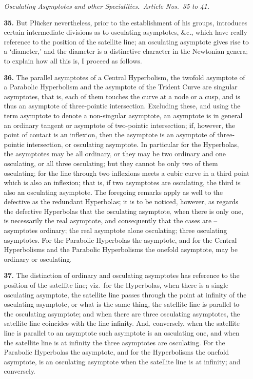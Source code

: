 \documentclass[11pt,a4paper]{article}
\begin{document}
\medskip

\noindent\textit{Osculating Asymptotes and other Specialities.\ Article Nos.\ 35 to 41.}

\medskip

\textbf{35.} But Pl\"ucker nevertheless, prior to the establishment of his groups, introduces certain intermediate divisions as to osculating asymptotes, \&c., which have really reference to the position of the satellite line; an osculating asymptote gives rise to a `diameter,' and the diameter is a distinctive character in the Newtonian genera; to explain how all this is, I proceed as follows.

\medskip

\textbf{36.} The parallel asymptotes of a Central Hyperbolism, the twofold asymptote of a Parabolic Hyperbolism and the asymptote of the Trident Curve are singular asymptotes, that is, each of them touches the curve at a node or a cusp, and is thus an asymptote of three-pointic intersection. Excluding these, and using the term asymptote to denote a non-singular asymptote, an asymptote is in general an ordinary tangent or asymptote of two-pointic intersection; if, however, the point of contact is an inflexion, then the asymptote is an asymptote of three-pointic intersection, or osculating asymptote. In particular for the Hyperbolas, the asymptotes may be all ordinary, or they may be two ordinary and one osculating, or all three osculating; but they cannot be only two of them osculating; for the line through two inflexions meets a cubic curve in a third point which is also an inflexion; that is, if two asymptotes are osculating, the third is also an osculating asymptote. The foregoing remarks apply as well to the defective as the redundant Hyperbolas; it is to be noticed, however, as regards the defective Hyperbolas that the osculating asymptote, when there is only one, is necessarily the real asymptote, and consequently that the cases are -- asymptotes ordinary; the real asymptote alone osculating; three osculating asymptotes. For the Parabolic Hyperbolas the asymptote, and for the Central Hyperbolisms and the Parabolic Hyperbolisms the onefold asymptote, may be ordinary or osculating.

\medskip

\textbf{37.} The distinction of ordinary and osculating asymptotes has reference to the position of the satellite line; viz.\ for the Hyperbolas, when there is a single osculating asymptote, the satellite line passes through the point at infinity of the osculating asymptote, or what is the same thing, the satellite line is parallel to the osculating asymptote; and when there are three osculating asymptotes, the satellite line coincides with the line infinity. And, conversely, when the satellite line is parallel to an asymptote such asymptote is an osculating one, and when the satellite line is at infinity the three asymptotes are osculating. For the Parabolic Hyperbolas the asymptote, and for the Hyperbolisms the onefold asymptote, is an osculating asymptote when the satellite line is at infinity; and conversely.
\end{document}
